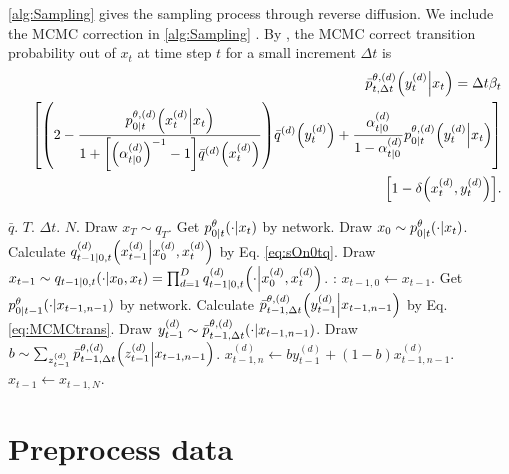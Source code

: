 \documentclass{article}
\begin{document}
\cref{alg:Sampling} gives the sampling process through reverse diffusion. We include the MCMC correction in \cref{alg:Sampling} \cite{song2020score,campbell2022continuous,zhao2024unified}. By \cite{zhao2024unified}, the MCMC correct transition probability out of $x_t$ at time step $t$ for a small increment $\Delta t$ is
\begin{eqnarray}\label{eq:MCMCtrans}
  &&\bar{p}^{\theta,(d)}_{t,\Delta t}\qty(y^{(d)}_t\middle|x_t) = \Delta t\beta_t\nonumber\\
  &&\qty[\qty(2-\frac{p^{\theta,(d)}_{0|t}\qty(x^{(d)}_t\middle|x_t)}{1+\qty[\qty(\alpha^{(d)}_{t|0})^{-1}-1]\bar{q}^{(d)}\qty(x^{(d)}_t)})\bar{q}^{(d)}\qty(y^{(d)}_t) + \frac{\alpha^{(d)}_{t|0}}{1-\alpha^{(d)}_{t|0}}p^{\theta,(d)}_{0|t}\qty(y^{(d)}_t\middle|x_t)]\nonumber\\
  &&\qty[1 - \delta\qty(x^{(d)}_t,y^{(d)}_t)].
\end{eqnarray}

\begin{algorithm}[H]
  \caption{Sampling}
  \label{alg:Sampling}
  \begin{algorithmic}
    \Require $\bar{q}$. $T$. $\Delta t$. $N$.
    \State Draw $x_T\sim q_T$.
    \State Get $p^\theta_{0|t}\qty(\cdot\middle|x_t)$ by network.
    \State Draw $x_0\sim p^\theta_{0|t}\qty(\cdot\middle|x_t)$.
    \State Calculate $q^{(d)}_{t-1|0,t}\qty(x^{(d)}_{t-1}\middle|x^{(d)}_0,x^{(d)}_t)$ by Eq. \eqref{eq:sOn0tq}.
    \State Draw $x_{t-1}\sim q_{t-1|0,t}\qty(\cdot\middle|x_0,x_t)=\prod_{d=1}^D q^{(d)}_{t-1|0,t}\qty(\cdot\middle|x^{(d)}_0,x^{(d)}_t)$.
    :
    \State $x_{t-1,0}\gets x_{t-1}$.
    \State Get $p^\theta_{0|t-1}\qty(\cdot\middle|x_{t-1,n-1})$ by network.
    \State Calculate $\bar{p}^{\theta,(d)}_{t-1,\Delta t}\qty(y^{(d)}_{t-1}\middle|x_{t-1,n-1})$ by Eq. \eqref{eq:MCMCtrans}.
    \State Draw $y^{(d)}_{t-1}\sim \bar{p}^{\theta,(d)}_{t-1,\Delta t}\qty(\cdot|x_{t-1,n-1})$.
    \State Draw $b\sim \sum_{z^{(d)}_{t-1}}\bar{p}^{\theta,(d)}_{t-1,\Delta t}\qty(z^{(d)}_{t-1}\middle|x_{t-1,n-1})$.
    \State $x^{(d)}_{t-1,n}\gets b y^{(d)}_{t-1} + (1-b)x^{(d)}_{t-1,n-1}$.
    \EndFor
    \EndFor
    \State $x_{t-1}\gets x_{t-1,N}$.
    \EndIf
    \EndFor
  \end{algorithmic}
\end{algorithm}

\section{Preprocess data}
\end{document}
